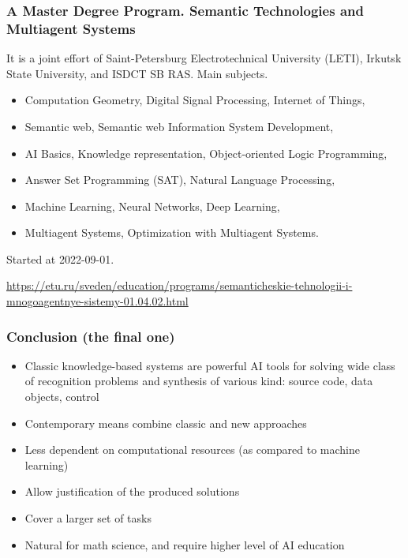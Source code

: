 \documentclass[10pt]{beamer}
\begin{document}
 \begin{frame}
   \frametitle{A Master Degree Program. Semantic Technologies and Multiagent Systems}
   It is a joint effort of Saint-Petersburg Electrotechnical University (LETI), Irkutsk State University, and ISDCT SB RAS.
   Main subjects.

   \begin{itemize}
   \item Computation Geometry, Digital Signal Processing, Internet of Things,
   \item Semantic web, Semantic web Information System Development,
   \item AI Basics, Knowledge representation, Object-oriented Logic Programming,
   \item Answer Set Programming (SAT), Natural Language Processing,
   \item Machine Learning, Neural Networks, Deep Learning,
   \item Multiagent Systems, Optimization with Multiagent Systems.
   \end{itemize}

   Started at 2022-09-01.

   {\footnotesize \url{https://etu.ru/sveden/education/programs/semanticheskie-tehnologii-i-mnogoagentnye-sistemy-01.04.02.html}}
 \end{frame}


 \begin{frame}
   \frametitle{Conclusion (the final one)}
   \begin{itemize}
   \item Classic knowledge-based systems are powerful AI tools for solving wide class of recognition problems and synthesis of various kind: source code, data objects, control
   \item Contemporary means combine classic and new approaches
   \item Less dependent on computational resources (as compared to machine learning)
   \item Allow justification of the produced solutions
   \item Cover a larger set of tasks
   \item Natural for math science, and require higher level of AI education
   \end{itemize}
 \end{frame}

\end{document}
